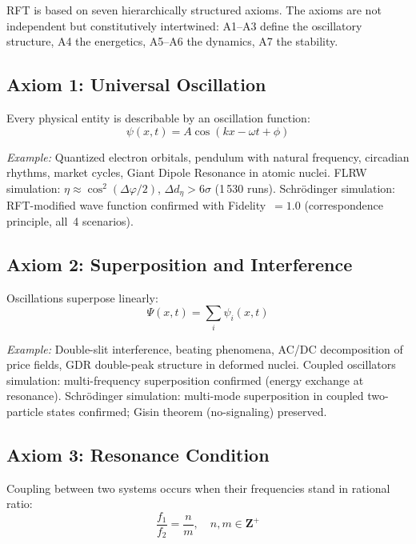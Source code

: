 \documentclass[12pt]{iopart}
\providecommand{\mathbb}[1]{\mathbf{#1}}
\begin{document}
	RFT is based on seven hierarchically structured axioms.
	The axioms are not independent but constitutively
	intertwined: A1--A3 define the oscillatory structure,
	A4 the energetics, A5--A6 the dynamics, A7 the stability.
	
	\subsection{Axiom 1: Universal Oscillation}
	
	Every physical entity is describable by an oscillation
	function:
	\begin{equation}
		\psi(x, t) = A \cos(kx - \omega t + \phi)
		\label{eq:oscillation}
	\end{equation}
	
	\textit{Example:} Quantized electron orbitals, pendulum with
	natural frequency, circadian rhythms, market cycles,
	Giant Dipole Resonance in atomic nuclei.
	FLRW simulation: $\eta \approx \cos^2(\Delta\varphi/2)$,
	$\Delta d_\eta > 6\sigma$ (1\,530 runs).
	Schrödinger simulation: RFT-modified wave function confirmed
	with Fidelity~$= 1.0$ (correspondence principle, all~4 scenarios).
	
	\subsection{Axiom 2: Superposition and Interference}
	
	Oscillations superpose linearly:
	\begin{equation}
		\Psi(x, t) = \sum_i \psi_i(x, t)
		\label{eq:superposition}
	\end{equation}
	
	\textit{Example:} Double-slit interference,
	beating phenomena, AC/DC decomposition of price fields,
	GDR double-peak structure in deformed nuclei.
	Coupled oscillators simulation: multi-frequency superposition
	confirmed (energy exchange at resonance).
	Schrödinger simulation: multi-mode superposition in coupled two-particle
	states confirmed; Gisin theorem (no-signaling) preserved.
	
	\subsection{Axiom 3: Resonance Condition}
	
	Coupling between two systems occurs when their
	frequencies stand in rational ratio:
	\begin{equation}
		\frac{f_1}{f_2} = \frac{n}{m}, \quad
		n, m \in \mathbb{Z}^+
		\label{eq:resonance_condition}
	\end{equation}
	
\end{document}
